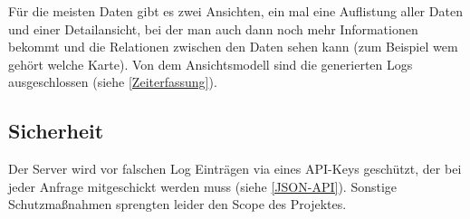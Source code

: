 \documentclass[../main.tex]{subfiles}
\begin{document}
\noindent Für die meisten Daten gibt es zwei Ansichten, ein mal eine Auflistung aller Daten und einer Detailansicht, bei der man auch dann noch mehr Informationen bekommt und die Relationen zwischen den Daten sehen kann (zum Beispiel wem gehört welche Karte). Von dem Ansichtsmodell sind die generierten Logs ausgeschlossen (siehe \ref{Zeiterfassung}).

\subsection{Sicherheit}

Der Server wird vor falschen Log Einträgen via eines API-Keys geschützt, der bei jeder Anfrage mitgeschickt werden muss (siehe \ref{JSON-API}). Sonstige Schutzmaßnahmen sprengten leider den Scope des Projektes.
\end{document}
